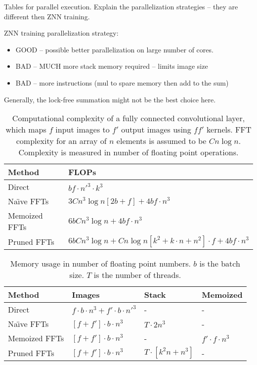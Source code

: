 \documentclass[conference]{IEEEtran}
\begin{document}
Tables for parallel execution.  Explain the parallelization strategies
-- they are different then ZNN training.

ZNN training parallelization strategy:

\begin{itemize}
\item GOOD -- possible better parallelization on large number of cores.
\item BAD -- MUCH more stack memory required -- limits image size
\item BAD -- more instructions (mul to spare memory then add to the sum)
\end{itemize}

Generally, the lock-free summation might not be the best choice here.

\begin{table}
  \centering
  \begin{tabular}{ll}
    \hline
    Method    &FLOPs
    \\ \hline
    Direct & $bf \cdot n'^3 \cdot k^3$
    \\
    Na\"{\i}ve FFTs & $3Cn^3 \log n[2b + f] + 4b f \cdot n^3$
    \\
    Memoized FFTs & $6bCn^3 \log n + 4b f \cdot n^3$
    \\
    Pruned FFTs & $6bCn^3 \log n + C n\log n[k^2 + k \cdot n + n^2] \cdot f + 4b f \cdot n^3$
    \\ \hline
  \end{tabular}
  \caption{Computational complexity of a fully connected convolutional
    layer, which maps $f$ input images to $f'$ output images using
    $ff'$ kernels. FFT complexity for an array of $n$ elements is
    assumed to be $Cn\log n$.  Complexity is measured in number of
    floating point operations.}
  \label{table:conv_complexity}
\end{table}


\begin{table}
  \centering
  \begin{tabular}{llll}
    \hline
    Method    &Images   &Stack   &Memoized
    \\ \hline
    Direct & $f \cdot b \cdot n^3 + f' \cdot b \cdot n'^3$ & - & -
    \\
    Na\"{\i}ve FFTs & $[f + f'] \cdot b \cdot  n^3$ & $T \cdot 2n^3$ & -
    \\
    Memoized FFTs & $[f + f'] \cdot b \cdot  n^3$ & - & $f' \cdot f \cdot n^3$
    \\
    Pruned FFTs & $[f + f'] \cdot b \cdot  n^3$ & $T \cdot [k^2n + n^3]$ & -
    \\ \hline
  \end{tabular}
  \caption{Memory usage in number of floating point numbers. $b$ is
    the batch size.  $T$ is the number of threads.}
  \label{table:conv_memory}
\end{table}
\end{document}
